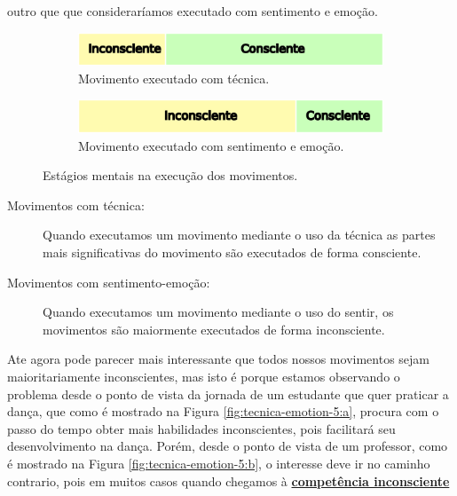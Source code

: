 outro que que consideraríamos executado com sentimento e emoção.
\begin{figure}[ht]
\centering
    \begin{subfigure}[t]{.48\textwidth}
      \centering
      \includegraphics[width=.975\linewidth]{chapters/cap-musicalidade-tecnica/tecnica-emotion-4a}  
      \caption{Movimento executado com técnica.}
      \label{fig:tecnica-emotion-4:a}
    \end{subfigure}
    \hfill
    \begin{subfigure}[t]{.48\textwidth}
      \centering
      \includegraphics[width=.975\linewidth]{chapters/cap-musicalidade-tecnica/tecnica-emotion-4b}  
      \caption{Movimento executado com sentimento e emoção.}
      \label{fig:tecnica-emotion-4:b}
    \end{subfigure}
    \caption{Estágios mentais na execução dos movimentos.}
    \label{fig:tecnica-emotion-4}
\end{figure}
\begin{description}
\item [Movimentos com técnica:] Quando executamos um movimento mediante o uso da técnica 
as partes mais significativas do movimento são executados de forma consciente.
\item [Movimentos com sentimento-emoção:] Quando executamos um movimento mediante o uso do sentir, 
os movimentos são maiormente executados de forma inconsciente.
\end{description}
Ate agora pode parecer mais interessante que todos nossos movimentos sejam maioritariamente inconscientes,
mas isto é porque estamos observando o problema desde o ponto de vista da jornada de um estudante
que quer praticar a dança, que como é mostrado na Figura \ref{fig:tecnica-emotion-5:a},
procura com o passo do tempo obter mais habilidades inconscientes,
pois facilitará seu desenvolvimento na dança.
Porém, desde o ponto de vista de um professor,
como é mostrado na Figura \ref{fig:tecnica-emotion-5:b}, 
o interesse deve ir no caminho contrario,
pois em muitos casos quando chegamos à \hyperref[ref:CompetenciaInconsciente]{\textbf{competência inconsciente}}
